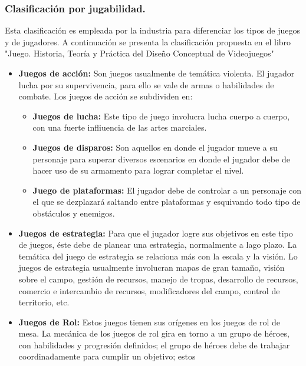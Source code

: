 		\subsubsection{Clasificación por jugabilidad.}
		Esta clasificación es empleada por la industria para diferenciar los tipos de 
		juegos y de jugadores. A continuación se presenta la clasificación propuesta 
		en el libro "Juego. Historia, Teoría y Práctica del Diseño Conceptual de 
		Videojuegos"\cite{Ref_JuegoDisenio}  
			\begin{itemize}
				\item \textbf{Juegos de acción:} Son juegos usualmente de temática 
				violenta. El jugador lucha por su supervivencia, para ello se vale 
				de armas o habilidades de  combate. Los juegos de acción se subdividen 
				en:
				\begin{itemize}
					\item \textbf{Juegos de lucha:} Este tipo de juego involucra lucha
					 cuerpo a cuerpo, con una fuerte infliuencia de las artes marciales.
					\item \textbf{Juegos de disparos:} Son aquellos en donde el jugador 
					mueve a su personaje para superar diversos escenarios en donde el 
					jugador debe de hacer uso de su armamento para lograr completar el 
					nivel.
					\item \textbf{Juego de plataformas:} El jugador debe de controlar a 
					un personaje con el que se dezplazará saltando entre plataformas y 
					esquivando todo tipo de obstáculos y enemigos.
				\end{itemize}
				\item \textbf{Juegos de estrategia:} Para que el jugador logre sus 
				objetivos en este tipo de juegos, éste debe de planear una estrategia, 
				normalmente a lago plazo. La temática del juego de estrategia se 
				relaciona más con la escala y la visión. Lo juegos de estrategia 
				usualmente involucran mapas de gran tamaño, visión sobre el campo, 
				gestión de recursos, manejo de tropas, desarrollo de recursos, comercio 
				e intercambio de recursos, modificadores del campo, control de 
				territorio, etc.
				\item \textbf{Juegos de Rol:} Estos juegos tienen sus orígenes en los 
				juegos de rol de mesa. La mecánica de los juegos de rol gira en torno a 
				un grupo de héroes, con habilidades y progresión definidos; el grupo de 
				héroes debe de trabajar coordinadamente para cumplir un objetivo; estos 

\end{itemize}
